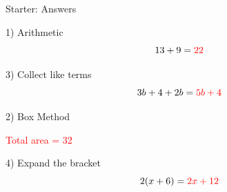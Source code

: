 \documentclass{beamer}
\begin{document}
\begin{frame}{Starter: Answers}
\begin{minipage}[t]{0.48\textwidth}

\begin{block}{1) Arithmetic}
\Large
\[
13 + 9 = \textcolor{red}{22}
\]
\end{block}

\vspace{6.2em}

\begin{block}{3) Collect like terms}
\Large
\[
3b + 4 + 2b = \textcolor{red}{5b + 4}
\]
\end{block}

\end{minipage}\hfill
\begin{minipage}[t]{0.48\textwidth}

\begin{block}{2) Box Method}
\centering
{}

\vspace{0.4em}
\textcolor{red}{Total area = 32}

\end{block}

\vspace{0.6em}

\begin{block}{4) Expand the bracket}
\Large
\[
2(x+6) = \textcolor{red}{2x + 12}
\]
\end{block}

\end{minipage}
\end{frame}
\end{document}
